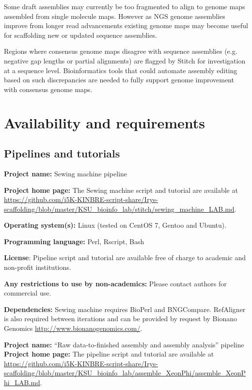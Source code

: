 \documentclass{bmcart}
\begin{document}
Some draft assemblies may currently be too fragmented to align to genome maps assembled from single molecule maps. However as NGS genome assemblies improve from longer read advancements existing genome maps may become useful for scaffolding new or updated sequence assemblies.

Regions where consensus genome maps disagree with sequence assemblies (e.g. negative gap lengths or partial alignments) are flagged by Stitch for investigation at a sequence level. Bioinformatics tools that could automate assembly editing based on such discrepancies are needed to fully support genome improvement with consensus genome maps. 

\section*{Availability and requirements}

\subsection*{\textbf{Pipelines and tutorials}}
\textbf{Project name:} Sewing machine pipeline

\textbf{Project home page:} The Sewing machine script and tutorial are available at \url{https://github.com/i5K-KINBRE-script-share/Irys-scaffolding/blob/master/KSU\_bioinfo\_lab/stitch/sewing\_machine\_LAB.md}. 

\textbf{Operating system(s):} Linux (tested on CentOS 7, Gentoo and Ubuntu).

\textbf{Programming language:} Perl, Rscript, Bash

\textbf{License}: Pipeline script and tutorial are available free of charge to academic and non-profit institutions.

\textbf{Any restrictions to use by non-academics:} Please contact authors for commercial use.

\textbf{Dependencies:} Sewing machine requires BioPerl and BNGCompare. RefAligner is also required between iterations and can be provided by request by Bionano Genomics \url{http://www.bionanogenomics.com/}.

\textbf{Project name:} {\textquotedblleft}Raw data-to-finished assembly and assembly analysis{\textquotedblright} pipeline
\textbf{Project home page:} The pipeline script and tutorial are available at \url{https://github.com/i5K-KINBRE-script-share/Irys-scaffolding/blob/master/KSU\_bioinfo\_lab/assemble\_XeonPhi/assemble\_XeonPhi\_LAB.md}.
\end{document}
